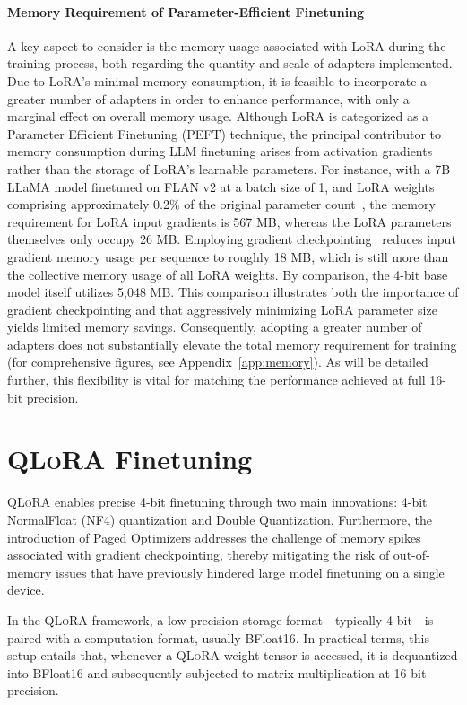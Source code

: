 \paragraph{Memory Requirement of Parameter-Efficient Finetuning} A key aspect to consider is the memory usage associated with LoRA during the training process, both regarding the quantity and scale of adapters implemented. Due to LoRA’s minimal memory consumption, it is feasible to incorporate a greater number of adapters in order to enhance performance, with only a marginal effect on overall memory usage. Although LoRA is categorized as a Parameter Efficient Finetuning (PEFT) technique, the principal contributor to memory consumption during LLM finetuning arises from activation gradients rather than the storage of LoRA’s learnable parameters. For instance, with a 7B LLaMA model finetuned on FLAN v2 at a batch size of 1, and LoRA weights comprising approximately 0.2\% of the original parameter count~\citep{hu2021lora,liu2022few}, the memory requirement for LoRA input gradients is 567 MB, whereas the LoRA parameters themselves only occupy 26 MB. Employing gradient checkpointing~\citep{chen2016training} reduces input gradient memory usage per sequence to roughly 18 MB, which is still more than the collective memory usage of all LoRA weights. By comparison, the 4-bit base model itself utilizes 5,048 MB. This comparison illustrates both the importance of gradient checkpointing and that aggressively minimizing LoRA parameter size yields limited memory savings. Consequently, adopting a greater number of adapters does not substantially elevate the total memory requirement for training (for comprehensive figures, see Appendix~\ref{app:memory}). As will be detailed further, this flexibility is vital for matching the performance achieved at full 16-bit precision.

\section{\textsc{QLoRA} Finetuning}

\textsc{QLoRA} enables precise 4-bit finetuning through two main innovations: 4-bit NormalFloat (NF4) quantization and Double Quantization. Furthermore, the introduction of Paged Optimizers addresses the challenge of memory spikes associated with gradient checkpointing, thereby mitigating the risk of out-of-memory issues that have previously hindered large model finetuning on a single device.

In the \textsc{QLoRA} framework, a low-precision storage format—typically 4-bit—is paired with a computation format, usually BFloat16. In practical terms, this setup entails that, whenever a \textsc{QLoRA} weight tensor is accessed, it is dequantized into BFloat16 and subsequently subjected to matrix multiplication at 16-bit precision.

